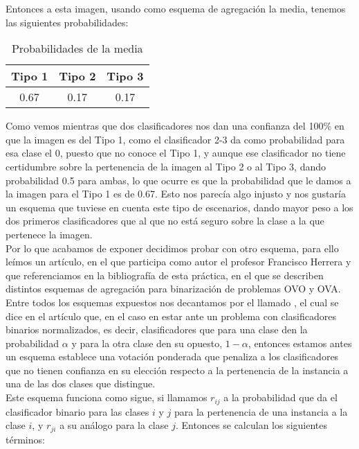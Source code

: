 Entonces a esta imagen, usando como esquema de agregación la media, tenemos las siguientes probabilidades:

\begin{table}[H]
\centering
\caption{Probabilidades de la media}
\begin{tabular}{|c|c|c|}
\hline
Tipo 1 & Tipo 2 & Tipo 3 \\ \hline
0.67   & 0.17   & 0.17   \\ \hline
\end{tabular}
\end{table}

Como vemos mientras que dos clasificadores nos dan una confianza del 100\% en que la imagen es del Tipo 1, como el clasificador 2-3 da como probabilidad para esa clase el 0, puesto que no conoce el Tipo 1, y aunque ese clasificador no tiene certidumbre sobre la pertenencia de la imagen al Tipo 2 o al Tipo 3, dando probabilidad 0.5 para ambas, lo que ocurre es que la probabilidad que le damos a la imagen para el Tipo 1 es de 0.67. Esto nos parecía algo injusto y nos gustaría un esquema que tuviese en cuenta este tipo de escenarios, dando mayor peso a los dos primeros clasificadores que al que no está seguro sobre la clase a la que pertenece la imagen.\\

Por lo que acabamos de exponer decidimos probar con otro esquema, para ello leímos un artículo, en el que participa como autor el profesor Francisco Herrera y que referenciamos en la bibliografía de esta práctica, en el que se describen distintos esquemas de agregación para binarización de problemas OVO y OVA. Entre todos los esquemas expuestos nos decantamos por el llamado , el cual se dice en el artículo que, en el caso en estar ante un problema con clasificadores binarios normalizados, es decir, clasificadores que para una clase den la probabilidad $\alpha$ y para la otra clase den su opuesto, $1 - \alpha$, entonces estamos antes un esquema establece una votación ponderada que penaliza a los clasificadores que no tienen confianza en su elección respecto a la pertenencia de la instancia a una de las dos clases que distingue.\\

Este esquema funciona como sigue, si llamamos $r_{ij}$ a la probabilidad que da el clasificador binario para las clases $i$ y $j$ para la pertenencia de una instancia a la clase $i$, y $r_{ji}$ a su análogo para la clase $j$. Entonces se calculan los siguientes términos:

